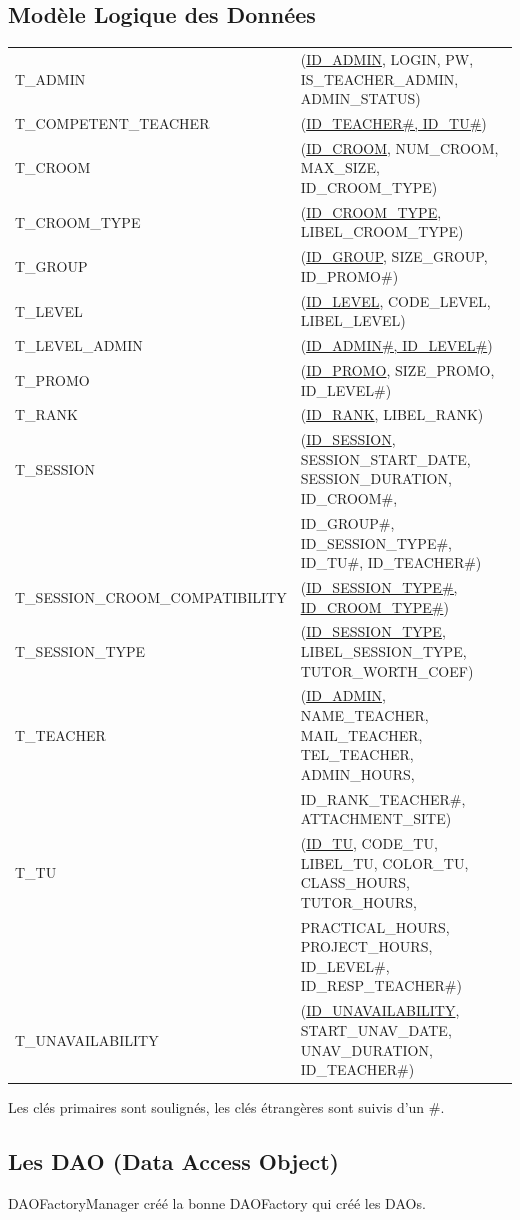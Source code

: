 \documentclass{article}
\begin{document}
\subsection{Modèle Logique des Données}
{\ttfamily
\begin{tabular}{l l}
T\_ADMIN & (\underline{ID\_ADMIN}, LOGIN, PW, IS\_TEACHER\_ADMIN, ADMIN\_STATUS) \\
T\_COMPETENT\_TEACHER & (\underline{ID\_TEACHER\#, ID\_TU\#}) \\
T\_CROOM & (\underline{ID\_CROOM}, NUM\_CROOM, MAX\_SIZE, ID\_CROOM\_TYPE) \\
T\_CROOM\_TYPE & (\underline{ID\_CROOM\_TYPE}, LIBEL\_CROOM\_TYPE) \\
T\_GROUP & (\underline{ID\_GROUP}, SIZE\_GROUP, ID\_PROMO\#) \\
T\_LEVEL & (\underline{ID\_LEVEL}, CODE\_LEVEL, LIBEL\_LEVEL) \\
T\_LEVEL\_ADMIN & (\underline{ID\_ADMIN\#, ID\_LEVEL\#}) \\
T\_PROMO & (\underline{ID\_PROMO}, SIZE\_PROMO, ID\_LEVEL\#) \\
T\_RANK & (\underline{ID\_RANK}, LIBEL\_RANK) \\
T\_SESSION & (\underline{ID\_SESSION}, SESSION\_START\_DATE, SESSION\_DURATION, ID\_CROOM\#, \\
           &  ID\_GROUP\#, ID\_SESSION\_TYPE\#, ID\_TU\#, ID\_TEACHER\#) \\
T\_SESSION\_CROOM\_COMPATIBILITY & (\underline{ID\_SESSION\_TYPE\#, ID\_CROOM\_TYPE\#}) \\
T\_SESSION\_TYPE & (\underline{ID\_SESSION\_TYPE}, LIBEL\_SESSION\_TYPE, TUTOR\_WORTH\_COEF) \\
T\_TEACHER & (\underline{ID\_ADMIN}, NAME\_TEACHER, MAIL\_TEACHER, TEL\_TEACHER, ADMIN\_HOURS, \\
          &  ID\_RANK\_TEACHER\#, ATTACHMENT\_SITE) \\
T\_TU & (\underline{ID\_TU}, CODE\_TU, LIBEL\_TU, COLOR\_TU, CLASS\_HOURS, TUTOR\_HOURS, \\
     &  PRACTICAL\_HOURS, PROJECT\_HOURS, ID\_LEVEL\#, ID\_RESP\_TEACHER\#) \\
T\_UNAVAILABILITY & (\underline{ID\_UNAVAILABILITY}, START\_UNAV\_DATE, UNAV\_DURATION, ID\_TEACHER\#) \\
\end{tabular}}
Les clés primaires sont soulignés, les clés étrangères sont suivis d'un {\ttfamily \#}.

\subsection{Les DAO (Data Access Object)}
DAOFactoryManager créé la bonne DAOFactory qui créé les DAOs.
\end{document}
